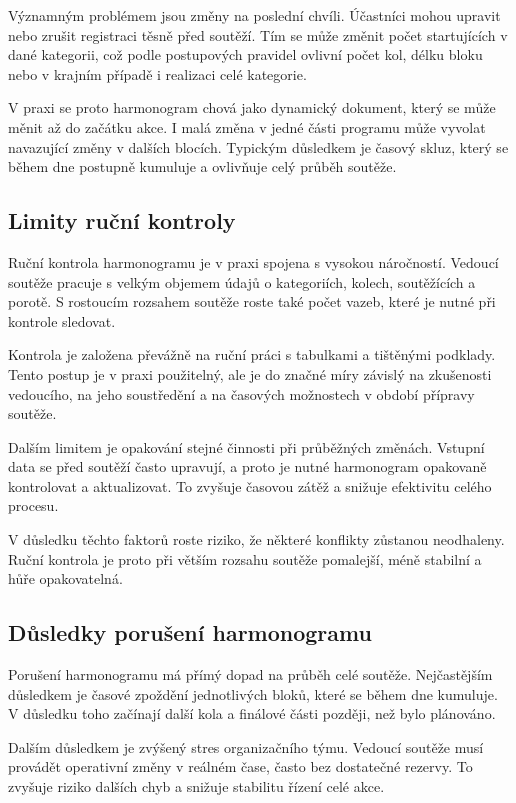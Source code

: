 \documentclass[czech, kiv, ba, he, iso690alph, pdf]{fasthesis}
\begin{document}
				Významným problémem jsou změny na poslední chvíli. Účastníci mohou upravit nebo zrušit registraci těsně před soutěží. Tím se může změnit počet startujících v dané kategorii, což podle postupových pravidel ovlivní počet kol, délku bloku nebo v krajním případě i realizaci celé kategorie.
	
				V praxi se proto harmonogram chová jako dynamický dokument, který se může měnit až do začátku akce. I malá změna v jedné části programu může vyvolat navazující změny v dalších blocích. Typickým důsledkem je časový skluz, který se během dne postupně kumuluje a ovlivňuje celý průběh soutěže.
	
			\subsection{Limity ruční kontroly}
	
				Ruční kontrola harmonogramu je v praxi spojena s vysokou náročností. Vedoucí soutěže pracuje s velkým objemem údajů o kategoriích, kolech, soutěžících a porotě. S rostoucím rozsahem soutěže roste také počet vazeb, které je nutné při kontrole sledovat.
	
				Kontrola je založena převážně na ruční práci s tabulkami a tištěnými podklady. Tento postup je v praxi použitelný, ale je do značné míry závislý na zkušenosti vedoucího, na jeho soustředění a na časových možnostech v období přípravy soutěže.
	
				Dalším limitem je opakování stejné činnosti při průběžných změnách. Vstupní data se před soutěží často upravují, a proto je nutné harmonogram opakovaně kontrolovat a aktualizovat. To zvyšuje časovou zátěž a snižuje efektivitu celého procesu.
	
				V důsledku těchto faktorů roste riziko, že některé konflikty zůstanou neodhaleny. Ruční kontrola je proto při větším rozsahu soutěže pomalejší, méně stabilní a hůře opakovatelná.

			\subsection{Důsledky porušení harmonogramu}

				Porušení harmonogramu má přímý dopad na průběh celé soutěže. Nejčastějším důsledkem je časové zpoždění jednotlivých bloků, které se během dne kumuluje. V důsledku toho začínají další kola a finálové části později, než bylo plánováno.
	
				Dalším důsledkem je zvýšený stres organizačního týmu. Vedoucí soutěže musí provádět operativní změny v reálném čase, často bez dostatečné rezervy. To zvyšuje riziko dalších chyb a snižuje stabilitu řízení celé akce.
	
\end{document}
